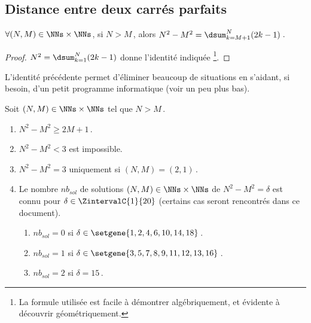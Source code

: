 \subsection{Distance entre deux carrés parfaits}

	
\begin{fact} \label{dist-square}
	$\forall (N, M) \in \NNs \times \NNs$, 
	si $N > M$\,, alors $N^2 - M^2 = \dsum_{k=M+1}^{N} (2 k - 1)$\,.
\end{fact}


\begin{proof}
	$N^2 = \dsum_{k=1}^{N} (2 k - 1)$ donne l'identité indiquée
	\footnote{
		La formule utilisée est facile à démontrer algébriquement, et évidente à découvrir géométriquement.
	}.
\end{proof}




L'identité précédente permet d'éliminer beaucoup de situations en s'aidant, si besoin, d'un petit programme informatique (voir un peu plus bas).

\begin{fact} \label{diff-square-ko}
	Soit $(N, M) \in \NNs \times \NNs$ tel que $N > M$\,.
	\begin{enumerate}
		\item $N^2 - M^2 \geq 2M + 1$\,.
		
		\item $N^2 - M^2 < 3$ est impossible.
		
		\item $N^2 - M^2 = 3$ uniquement si $(N, M) = (2, 1)$\,.
		
		\item Le nombre $nb_{sol}$ de solutions $(N, M) \in \NNs \times \NNs$ de $N^2 - M^2 = \delta$ est connu pour $\delta \in \ZintervalC{1}{20}$ (certains cas seront rencontrés dans ce document).
		\begin{enumerate}
			\item $nb_{sol}= 0$ si $\delta \in \setgene{1, 2, 4, 6, 10, 14, 18}$\,.

			\item $nb_{sol}= 1$ si $\delta \in \setgene{3, 5, 7, 8, 9, 11, 12, 13, 16}$\,.

			\item $nb_{sol}= 2$ si $\delta = 15$\,.
		\end{enumerate}
	\end{enumerate}
\end{fact}


